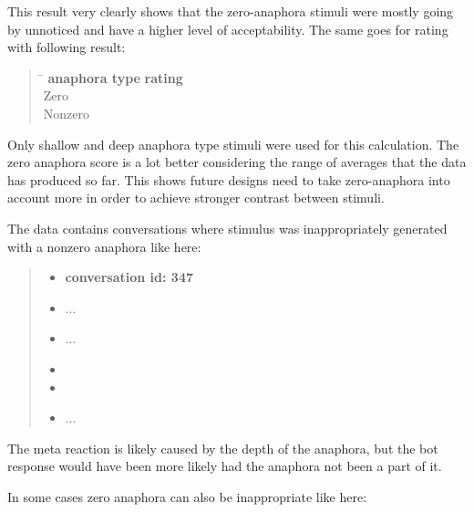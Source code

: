 This result very clearly shows that the zero-anaphora stimuli were mostly going by unnoticed
and have a higher level of acceptability.
The same goes for rating with following result:

\begin{quote}
\begin{tabbing}
\hspace{4cm} \= \hspace{3cm} \kill %
\textbf{anaphora type} \> \textbf{rating}\\
Zero  \\
Nonzero  \\
\end{tabbing}
\end{quote}

Only shallow and deep anaphora type stimuli were used for this calculation.
The zero anaphora score is a lot better considering the range of averages
that the data has produced so far.
This shows future designs need to take zero-anaphora into account more
in order to achieve stronger contrast between stimuli.

The data contains conversations where stimulus was
inappropriately generated with a nonzero anaphora like here:

\begin{quote}
\begin{itemize}[label={}, leftmargin=0pt, itemsep=0.5em]
\item \textbf{conversation id: 347}
\item ...
\item {}
...
\item {}
\item {}
\item ...
\end{itemize}
\end{quote}

The meta reaction is likely caused by the depth of the anaphora,
but the bot response would have been more likely had the anaphora not been a part of it.

In some cases zero anaphora can also be inappropriate like here:

